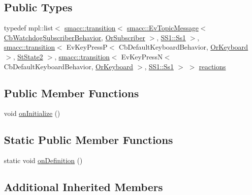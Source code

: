 \subsection*{Public Types}
\begin{DoxyCompactItemize}
\item 
typedef mpl\+::list$<$ \hyperlink{classsmacc_1_1transition}{smacc\+::transition}$<$ \hyperlink{structsmacc_1_1default__events_1_1EvTopicMessage}{smacc\+::\+Ev\+Topic\+Message}$<$ \hyperlink{classsm__three__some_1_1cl__subscriber_1_1CbWatchdogSubscriberBehavior}{Cb\+Watchdog\+Subscriber\+Behavior}, \hyperlink{classsm__three__some_1_1OrSubscriber}{Or\+Subscriber} $>$, \hyperlink{structsm__three__some_1_1SS1_1_1Ss1}{S\+S1\+::\+Ss1} $>$, \hyperlink{classsmacc_1_1transition}{smacc\+::transition}$<$ Ev\+Key\+PressP$<$ Cb\+Default\+Keyboard\+Behavior, \hyperlink{classsm__three__some_1_1OrKeyboard}{Or\+Keyboard} $>$, \hyperlink{structsm__three__some_1_1StState2}{St\+State2} $>$, \hyperlink{classsmacc_1_1transition}{smacc\+::transition}$<$ Ev\+Key\+PressN$<$ Cb\+Default\+Keyboard\+Behavior, \hyperlink{classsm__three__some_1_1OrKeyboard}{Or\+Keyboard} $>$, \hyperlink{structsm__three__some_1_1SS1_1_1Ss1}{S\+S1\+::\+Ss1} $>$ $>$ \hyperlink{structsm__three__some_1_1StState3_a4136eb83635553c4ccc8ab0ca217a8f2}{reactions}
\end{DoxyCompactItemize}
\subsection*{Public Member Functions}
\begin{DoxyCompactItemize}
\item 
void \hyperlink{structsm__three__some_1_1StState3_a1828977fe52a7d68ba2368517927b1d9}{on\+Initialize} ()
\end{DoxyCompactItemize}
\subsection*{Static Public Member Functions}
\begin{DoxyCompactItemize}
\item 
static void \hyperlink{structsm__three__some_1_1StState3_abed2f14f5f5e3f039797d520442cb389}{on\+Definition} ()
\end{DoxyCompactItemize}
\subsection*{Additional Inherited Members}


